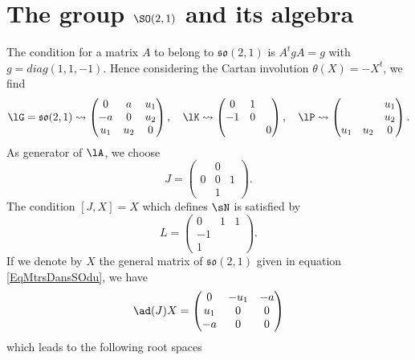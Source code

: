 
\section{The group \texorpdfstring{$\SO(2,1)$}{SO21} and its algebra}   \label{subsec_IwSOdu}

The condition for a matrix $A$ to belong to $\mathfrak{so}(2,1)$ is $A^tgA=g$ with $g=diag(1,1,-1)$. Hence considering the Cartan involution\label{pg:Cartan_SO} $\theta(X)=-X^t$, we find
\begin{equation}  \label{EqMtrsDansSOdu}
\lG=\mathfrak{so}(2,1)\leadsto\begin{pmatrix}
0&a&u_1\\-a&0&u_2\\u_1&u_2&0
\end{pmatrix},\quad
\lK\leadsto\begin{pmatrix}
0&1\\-1&0\\&&0
\end{pmatrix},
\quad
\lP\leadsto\begin{pmatrix}
&&u_1\\
&&u_2\\
u_1&u_2&0
\end{pmatrix}.
\end{equation}
As generator of $\lA$, we choose
\[ 
  J=\begin{pmatrix}
&0\\
0&0&1\\
&1
\end{pmatrix}.
\]
The condition $[J,X]=X$ which defines $\sN$ is satisfied by
\[ 
  L=\begin{pmatrix}
0&1&1\\-1\\1
\end{pmatrix}.
\]
If we denote by $X$ the general matrix of $\mathfrak{so}(2,1)$ given in equation \eqref{EqMtrsDansSOdu}, we have
\[ 
  \ad(J)X=
\begin{pmatrix}
0&-u_{1}&-a\\
u_{1}&0&0\\
-a&0&0
\end{pmatrix}
\]
which leads to the following root spaces
